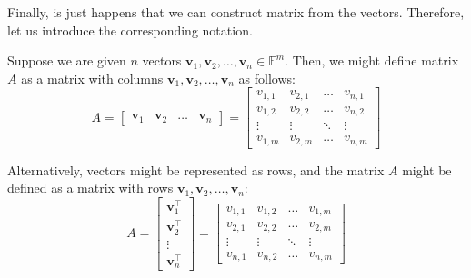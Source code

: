 \documentclass[../lecture-notes.tex]{subfiles}
\begin{document}
Finally, is just happens that we can construct matrix from the vectors. Therefore, let us introduce the corresponding notation.
\begin{definition}
    Suppose we are given $n$ vectors $\mathbf{v}_1,\mathbf{v}_2,\dots,\mathbf{v}_n \in \mathbb{F}^m$. Then, we might define matrix $A$ as a matrix with columns $\mathbf{v}_1,\mathbf{v}_2,\dots,\mathbf{v}_n$ as follows:
    \begin{equation*}
        A = \begin{bmatrix}
            \mathbf{v}_1 & \mathbf{v}_2 & \dots & \mathbf{v}_n
        \end{bmatrix} = \begin{bmatrix}
            v_{1,1} & v_{2,1} & \dots & v_{n,1} \\
            v_{1,2} & v_{2,2} & \dots & v_{n,2} \\
            \vdots & \vdots & \ddots & \vdots \\
            v_{1,m} & v_{2,m} & \dots & v_{n,m}
        \end{bmatrix}
    \end{equation*}

    Alternatively, vectors might be represented as rows, and the matrix $A$ might be defined as a matrix with rows $\mathbf{v}_1,\mathbf{v}_2,\dots,\mathbf{v}_n$:
    \begin{equation*}
        A = \begin{bmatrix}
            \mathbf{v}_1^{\top} \\ \mathbf{v}_2^{\top} \\ \vdots \\ \mathbf{v}_n^{\top}
        \end{bmatrix} = \begin{bmatrix}
            v_{1,1} & v_{1,2} & \dots & v_{1,m} \\
            v_{2,1} & v_{2,2} & \dots & v_{2,m} \\
            \vdots & \vdots & \ddots & \vdots \\
            v_{n,1} & v_{n,2} & \dots & v_{n,m}
        \end{bmatrix}
    \end{equation*}
\end{definition}
\end{document}
